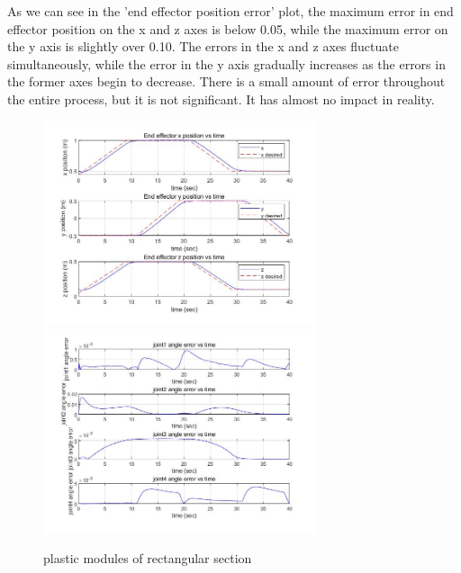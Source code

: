 As we can see in the 'end effector position error' plot, the maximum error in end effector position on the x and z axes is below 0.05, while the maximum error on the y axis is slightly over 0.10. The errors in the x and z axes fluctuate simultaneously, while the error in the y axis gradually increases as the errors in the former axes begin to decrease. There is a small amount of error throughout the entire process, but it is not significant. It has almost no impact in reality.

\begin{figure}[htbp]
	\centering
	\includegraphics[width=8cm]{./fig/5.jpg}
	\includegraphics[width=8cm]{./fig/7.jpg}
	\caption{plastic modules of rectangular section}
	\label{F 5.12}
\end{figure}